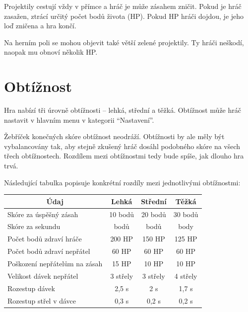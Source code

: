 \documentclass[12pt,a4paper,hidelinks]{article}
\begin{document}
Projektily cestují vždy v přímce a hráč je může zásahem zničit. Pokud je hráč zasažen, ztrácí určitý počet bodů života (HP). Pokud HP hráči dojdou, je jeho loď zničena a hra končí.

Na herním poli se mohou objevit také větší zelené projektily. Ty hráči neškodí, naopak mu obnoví několik HP.

\section{Obtížnost}
Hra nabízí tři úrovně obtížnosti -- lehká, střední a těžká. Obtížnost může hráč nastavit v hlavním menu v kategorii \enquote{Nastavení}.

Žebříček konečných skóre obtížnost neodráží. Obtížnosti by ale měly být vybalancovány tak, aby stejně zkušený hráč dosáhl podobného skóre na všech třech obtížnostech. Rozdílem mezi obtížnostmi tedy bude spíše, jak dlouho hra trvá.

Následující tabulka popisuje konkrétní rozdíly mezi jednotlivými obtížnostmi:

\begin{table}[h!]
\centering
\begin{tabular}{@{}l|ccc@{}}
\toprule
\multicolumn{1}{c|}{\textbf{Údaj}} & \textbf{Lehká} & \textbf{Střední} & \textbf{Těžká} \\ \midrule
Skóre za úspěšný zásah             & 10 bodů        & 20 bodů          & 30 bodů        \\
Skóre za sekundu                   & \textminus5 bodů        & \textminus3 bodů          & \textminus2 body        \\
Počet bodů zdraví hráče            & 200 HP         & 150 HP           & 125 HP         \\
Počet bodů zdraví nepřátel         & 60 HP          & 60 HP            & 60 HP          \\
Poškození nepřátelům na zásah      & 15 HP          & 10 HP            & 10 HP          \\
Velikost dávek nepřátel            & 3 střely       & 3 střely         & 4 střely       \\
Rozestup dávek                     & 2,5 s          & 2 s              & 1,7 s          \\
Rozestup střel v dávce             & 0,3 s          & 0,2 s            & 0,2 s          \\ \bottomrule
\end{tabular}
\end{table}
\end{document}
